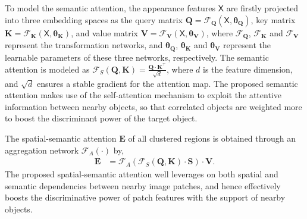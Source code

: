\documentclass[letterpaper]{article} %
\newcommand\red[1]{\textcolor{red}{#1}}
\newcommand\rjf[1]{\textcolor{red}{\{RJF: #1\}}}
\newcommand\qz[1]{\textcolor{blue}{\{QZ: #1\}}}
\begin{document}
To model the semantic attention, the appearance features $\bm{\mathsf{X}}$ are firstly projected into three embedding spaces as the query matrix $\bm{Q} = \mathcal{F}_{\bm{Q}}(\bm{\mathsf{X}}, \bm{\theta_{Q}})$, key matrix $\bm{K}= \mathcal{F}_{\bm{K}}(\bm{\mathsf{X}}, \bm{\theta_{K}})$, and value matrix $\bm{V}= \mathcal{F}_{\bm{V}}(\bm{\mathsf{X}}, \bm{\theta_{V}})$, %
where $\mathcal{F}_{\bm{Q}}$, $\mathcal{F}_{\bm{K}}$ and $\mathcal{F}_{\bm{V}}$ represent the transformation networks, and $\bm{\theta_{Q}}$, $\bm{\theta_{K}}$ and $\bm{\theta_{V}}$ represent the learnable parameters of these three networks, respectively. The semantic attention is modeled as $\mathcal{F}_{S}(\bm{Q},\bm{K}) = \frac{\bm{Q} \cdot \bm{K}^\top}{\sqrt{d}}$,
where $d$ is the feature dimension, and $\sqrt{d}$ ensures a stable gradient for the attention map. The proposed semantic attention makes use of the self-attention mechanism to exploit the attentive information between nearby objects, so that correlated objects are weighted more to boost the discriminant power of the target object.


The spatial-semantic attention $\bm{E}$ of all clustered regions is obtained through an aggregation network $\mathcal{F}_{A}(\cdot)$ %
by,
\begin{align}
	\label{eqn:FA}
  \bm{E} &= \mathcal{F}_{A}(\mathcal{F}_{S}(\bm{Q},\bm{K}) \cdot \bm{S}) \cdot \bm{V}.
\end{align}
The proposed spatial-semantic attention well leverages on both spatial and semantic dependencies between nearby image patches, %
and hence effectively boosts the discriminative power of patch features with the support of nearby objects.
\end{document}
